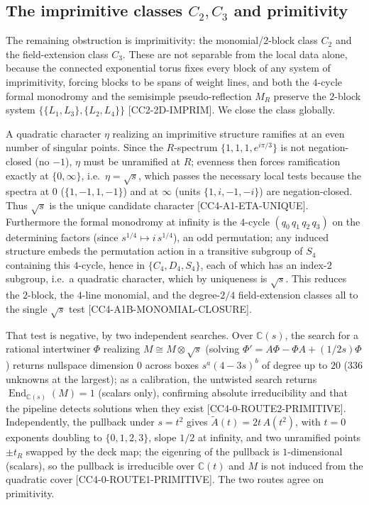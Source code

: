 \documentclass[11pt,reqno]{amsart}
\theoremstyle{plain}
\theoremstyle{definition}
\theoremstyle{remark}
\newcommand{\C}{\mathbb{C}}
\newcommand{\End}{\operatorname{End}}
\newcommand{\claim}[1]{\textsf{\small[#1]}}
\begin{document}
\subsection{The imprimitive classes $C_{2},C_{3}$ and primitivity}
\label{sec:primitive}
The remaining obstruction is imprimitivity: the monomial/$2$-block class
$C_{2}$ and the field-extension class $C_{3}$. These are not separable from the
local data alone, because the connected exponential torus fixes every block of
any system of imprimitivity, forcing blocks to be spans of weight lines, and
both the $4$-cycle formal monodromy and the semisimple pseudo-reflection
$M_{R}$ preserve the $2$-block system $\{\{L_{1},L_{3}\},\{L_{2},L_{4}\}\}$
\claim{CC2-2D-IMPRIM}. We close the class globally.

A quadratic character $\eta$ realizing an imprimitive structure ramifies at an
even number of singular points. Since the $R$-spectrum $\{1,1,1,e^{i\pi/3}\}$
is not negation-closed (no $-1$), $\eta$ must be unramified at $R$; evenness
then forces ramification exactly at $\{0,\infty\}$, i.e.\ $\eta=\sqrt{s}$, which
passes the necessary local tests because the spectra at $0$ ($\{1,-1,1,-1\}$)
and at $\infty$ (units $\{1,i,-1,-i\}$) are negation-closed. Thus $\sqrt{s}$ is
the unique candidate character \claim{CC4-A1-ETA-UNIQUE}. Furthermore the
formal monodromy at infinity is the $4$-cycle $(q_{0}\,q_{1}\,q_{2}\,q_{3})$ on
the determining factors (since $s^{1/4}\mapsto i\,s^{1/4}$), an odd permutation;
any induced structure embeds the permutation action in a transitive subgroup of
$S_{4}$ containing this $4$-cycle, hence in $\{C_{4},D_{4},S_{4}\}$, each of
which has an index-$2$ subgroup, i.e.\ a quadratic character, which by
uniqueness is $\sqrt{s}$. This reduces the $2$-block, the $4$-line monomial,
and the degree-$2/4$ field-extension classes all to the single $\sqrt{s}$ test
\claim{CC4-A1B-MONOMIAL-CLOSURE}.

That test is negative, by two independent searches. Over $\C(s)$, the search
for a rational intertwiner $\Phi$ realizing $M\cong M\otimes\sqrt{s}$ (solving
$\Phi'=A\Phi-\Phi A+(1/2s)\Phi$) returns nullspace dimension $0$ across boxes
$s^{a}(4-3s)^{b}$ of degree up to $20$ ($336$ unknowns at the largest); as a
calibration, the untwisted search returns $\End_{\C(s)}(M)=1$ (scalars only),
confirming absolute irreducibility and that the pipeline detects solutions when
they exist \claim{CC4-0-ROUTE2-PRIMITIVE}. Independently, the pullback under
$s=t^{2}$ gives $\tilde A(t)=2t\,A(t^{2})$, with $t=0$ exponents doubling to
$\{0,1,2,3\}$, slope $1/2$ at infinity, and two unramified points $\pm t_{R}$
swapped by the deck map; the eigenring of the pullback is $1$-dimensional
(scalars), so the pullback is irreducible over $\C(t)$ and $M$ is not induced
from the quadratic cover \claim{CC4-0-ROUTE1-PRIMITIVE}. The two routes agree
on primitivity.
\end{document}

